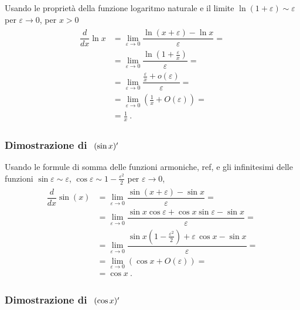\documentclass[letterpaper,10pt,italian]{jupyterBook}
\begin{document}
\sphinxAtStartPar
Usando le proprietà della funzione logaritmo naturale e il limite \(\ln(1 + \varepsilon) \sim \varepsilon\) per \(\varepsilon \rightarrow 0\), per \(x > 0\)
\begin{equation*}
\begin{split}\begin{aligned}
  \dfrac{d}{dx} \ln x       
  & = \lim_{\varepsilon \rightarrow 0}  \dfrac{\ln(x+\varepsilon) - \ln x}{\varepsilon} = \\
  & = \lim_{\varepsilon \rightarrow 0}  \dfrac{\ln \left(1 + \frac{\varepsilon}{x} \right)}{\varepsilon} = \\
  & = \lim_{\varepsilon \rightarrow 0}  \dfrac{\frac{\varepsilon}{x} + o(\varepsilon)}{\varepsilon} = \\
  & = \lim_{\varepsilon \rightarrow 0}  \left( \frac{1}{x} + O(\varepsilon) \right) = \\
  & = \frac{1}{x} \ .
\end{aligned}\end{split}
\end{equation*}\subsubsection*{Dimostrazione di \protect\(\ (\sin x)'\protect\)}

\sphinxAtStartPar
Usando le formule di somma delle funzioni armoniche,  ref, e gli infinitesimi delle funzioni \(\sin \varepsilon \sim \varepsilon\), \(\cos \varepsilon \sim 1 - \frac{\varepsilon^2}{2}\) per \(\varepsilon \rightarrow 0\),
\begin{equation*}
\begin{split}\begin{aligned}
  \dfrac{d}{dx} \sin(x) 
  & = \lim_{\varepsilon \rightarrow 0}  \dfrac{\sin(x+\varepsilon) - \sin x}{\varepsilon} = \\
  & = \lim_{\varepsilon \rightarrow 0} \dfrac{\sin x \cos \varepsilon + \cos x \sin \varepsilon - \sin x}{\varepsilon} = \\
  & = \lim_{\varepsilon \rightarrow 0} \dfrac{\sin x \left( 1 - \frac{\varepsilon^2}{2} \right) + \varepsilon \, \cos x - \sin x}{\varepsilon} = \\
  & = \lim_{\varepsilon \rightarrow 0} \left( \cos x + O(\varepsilon) \right) = \\
  & = \cos x \ .
\end{aligned}\end{split}
\end{equation*}\subsubsection*{Dimostrazione di \protect\(\ (\cos x)'\protect\)}
\end{document}
